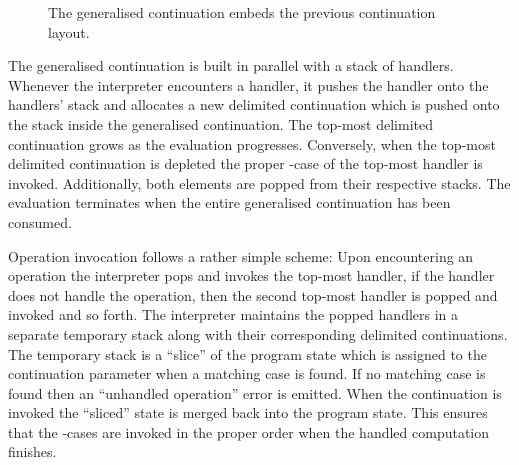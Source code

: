 \begin{figure}[H]
\begin{center}
\caption{The generalised continuation embeds the previous continuation layout.}\label{fig:continuation-notion}
\end{center}
\end{figure}

The generalised continuation is built in parallel with a stack of handlers. Whenever the interpreter encounters a handler, it pushes the handler onto the handlers' stack and allocates a new delimited continuation which is pushed onto the stack inside the generalised continuation. The top-most delimited continuation grows as the evaluation progresses. Conversely, when the top-most delimited continuation is depleted the proper -case of the top-most handler is invoked. Additionally, both elements are popped from their respective stacks. The evaluation terminates when the entire generalised continuation has been consumed.

Operation invocation follows a rather simple scheme: Upon encountering an operation the interpreter pops and invokes the top-most handler, if the handler does not handle the operation, then the second top-most handler is popped and invoked and so forth. The interpreter maintains the popped handlers in a separate temporary stack along with their corresponding delimited continuations. The temporary stack is a ``slice'' of the program state which is assigned to the continuation parameter when a matching case is found. If no matching case is found then an ``unhandled operation'' error is emitted. When the continuation is invoked the ``sliced'' state is merged back into the program state. This ensures that the -cases are invoked in the proper order when the handled computation finishes.
